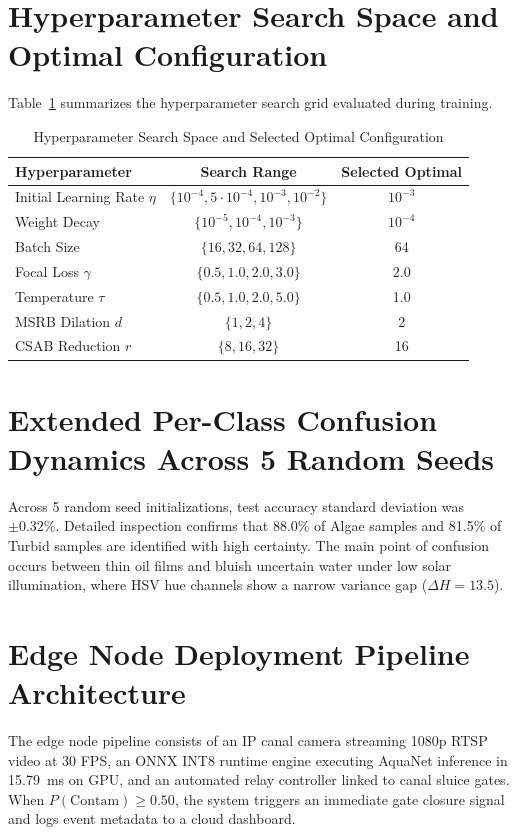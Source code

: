 \documentclass[journal]{IEEEtran}
\newcommand{\method}{AquaNet}
\begin{document}
\section{Hyperparameter Search Space and Optimal Configuration}
Table~\ref{tab:hyperparam_grid} summarizes the hyperparameter search grid evaluated during training.

\begin{table}[!h]
\centering
\caption{Hyperparameter Search Space and Selected Optimal Configuration}
\label{tab:hyperparam_grid}
\begin{tabular}{lcc}
\toprule
\textbf{Hyperparameter} & \textbf{Search Range} & \textbf{Selected Optimal} \\
\midrule
Initial Learning Rate $\eta$ & $\{10^{-4}, 5 \cdot 10^{-4}, 10^{-3}, 10^{-2}\}$ & $10^{-3}$ \\
Weight Decay & $\{10^{-5}, 10^{-4}, 10^{-3}\}$ & $10^{-4}$ \\
Batch Size & $\{16, 32, 64, 128\}$ & 64 \\
Focal Loss $\gamma$ & $\{0.5, 1.0, 2.0, 3.0\}$ & 2.0 \\
Temperature $\tau$ & $\{0.5, 1.0, 2.0, 5.0\}$ & 1.0 \\
MSRB Dilation $d$ & $\{1, 2, 4\}$ & 2 \\
CSAB Reduction $r$ & $\{8, 16, 32\}$ & 16 \\
\bottomrule
\end{tabular}
\end{table}

\section{Extended Per-Class Confusion Dynamics Across 5 Random Seeds}
Across 5 random seed initializations, test accuracy standard deviation was $\pm 0.32\%$. Detailed inspection confirms that 88.0\% of Algae samples and 81.5\% of Turbid samples are identified with high certainty. The main point of confusion occurs between thin oil films and bluish uncertain water under low solar illumination, where HSV hue channels show a narrow variance gap ($\Delta H = 13.5$).

\section{Edge Node Deployment Pipeline Architecture}
The edge node pipeline consists of an IP canal camera streaming 1080p RTSP video at 30 FPS, an ONNX INT8 runtime engine executing \method{} inference in 15.79~ms on GPU, and an automated relay controller linked to canal sluice gates. When $P(\text{Contam}) \ge 0.50$, the system triggers an immediate gate closure signal and logs event metadata to a cloud dashboard.




\balance
\end{document}
